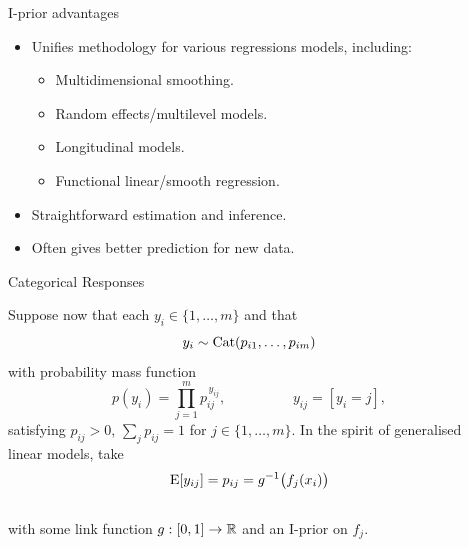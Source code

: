 \documentclass{beamer}
\newlength{\onecolwid}
\newlength{\twocolwid}
\begin{document}
\begin{frame}[t]
\begin{columns}[t]
\begin{column}{\twocolwid}
\begin{columns}[t,totalwidth=\twocolwid]
\begin{column}{\onecolwid}
\begin{alertblock}{I-prior advantages}
\begin{itemize}
  \item Unifies methodology for various regressions models, including: 
  \begin{itemize}
    \item Multidimensional smoothing.
    \item Random effects/multilevel models.
    \item Longitudinal models.
    \item Functional linear/smooth regression.
  \end{itemize}
  \item Straightforward estimation and inference.
  \item Often gives better prediction for new data.
\end{itemize}


\end{alertblock}


\begin{block}{Categorical Responses}

Suppose now that each $y_i \in \{ 1,\dots,m \}$ and that 
\[
  y_i \sim \operatorname{Cat}(p_{i1},\dots,p_{im})
\]
with probability mass function
\[
  p(y_i) = \prod_{j=1}^m p_{ij}^{\, y_{ij}}, \hspace{2cm} y_{ij} = [y_i = j],
\]  
satisfying $p_{ij} > 0$, $\sum_j p_{ij} = 1$ for $j \in \{ 1,\dots,m \}$.
In the spirit of generalised linear models, take
~\\[-20pt]
\[
  \operatorname{E}[y_{ij}] = p_{ij} = g^{-1}\big(f_j(x_i)\big)
\]
~\\[-28pt]
with some link function $g:[0,1] \to \mathbb{R}$ and an I-prior on $f_j$.
 
\end{block}

\end{column} %



\begin{column}{\onecolwid}  %




\end{column}
\end{columns}
\end{column}
\end{columns}
\end{frame}
\end{document}
